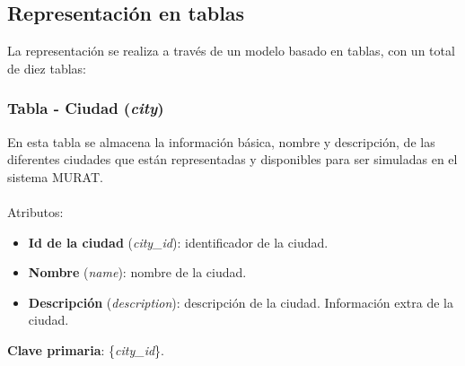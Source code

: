 \subsection{Representación en tablas}
La representación se realiza a través de un modelo basado en tablas, con un total de diez tablas:

\subsubsection{Tabla - Ciudad (\textit{city})}
En esta tabla se almacena la información básica, nombre y descripción, de las diferentes ciudades que están representadas y disponibles para ser simuladas en el sistema MURAT. \\\\
Atributos:
\begin{itemize}
    \item \textbf{Id de la ciudad} (\textit{city\_id}): identificador de la ciudad.
    \item \textbf{Nombre} (\textit{name}): nombre de la ciudad.
    \item \textbf{Descripción} (\textit{description}): descripción de la ciudad. Información extra de la ciudad.
\end{itemize}
\textbf{Clave primaria}: \{\textit{city\_id}\}. \\

